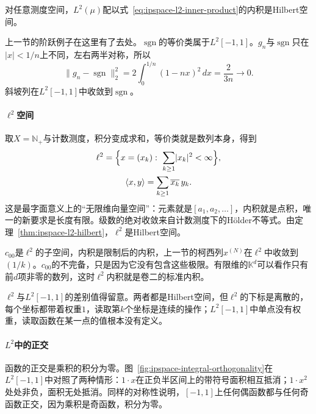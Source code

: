 \begin{theorem}[$L^2$是Hilbert空间]
\label{thm:ipspace-l2-hilbert}
对任意测度空间，$L^2(\mu)$配以式~\eqref{eq:ipspace-l2-inner-product}的内积是Hilbert空间。
\end{theorem}

上一节的阶跃例子在这里有了去处。$\operatorname{sgn}$的等价类属于$L^2[-1,1]$。$g_n$与$\operatorname{sgn}$只在$\lvert x\rvert<1/n$上不同，左右两半对称，所以
\[
 \lVert g_n-\operatorname{sgn}\rVert_2^2=2\int_0^{1/n}(1-nx)^2\,dx=\frac{2}{3n}\to0 .
\]
斜坡列在$L^2[-1,1]$中收敛到$\operatorname{sgn}$。

\paragraph{\texorpdfstring{$\ell^2$}{l2}空间}
取$X=\mathbb N_+$与计数测度，积分变成求和，等价类就是数列本身，得到
\begin{equation}
 \begin{gathered}
 \ell^2=\Bigl\{x=(x_k):\ \sum_{k\geq1}\lvert x_k\rvert^2<\infty\Bigr\},\\
 \langle x,y\rangle=\sum_{k\geq1}\overline{x_k}\,y_k .
 \end{gathered}
 \label{eq:ipspace-ell2}
\end{equation}
这是最字面意义上的“无限维向量空间”：元素就是$[a_1,a_2,\ldots]$，内积就是点积，唯一的新要求是长度有限。级数的绝对收敛来自计数测度下的Hölder不等式。由定理~\ref{thm:ipspace-l2-hilbert}，$\ell^2$是Hilbert空间。

$c_{00}$是$\ell^2$的子空间，内积是限制后的内积，上一节的柯西列$x^{(N)}$在$\ell^2$中收敛到$(1/k)$。$c_{00}$的不完备，只是因为它没有包含这些极限。有限维的$\mathbb K^d$可以看作只有前$d$项非零的数列，这时$\ell^2$内积就是卷二的标准内积。

$\ell^2$与$L^2[-1,1]$的差别值得留意。两者都是Hilbert空间，但$\ell^2$的下标是离散的，每个坐标都带着权重$1$，读取第$k$个坐标是连续的操作；$L^2[-1,1]$中单点没有权重，读取函数在某一点的值根本没有定义。

\paragraph{\texorpdfstring{$L^2$}{L2}中的正交}
函数的正交是乘积的积分为零。图~\ref{fig:ipspace-integral-orthogonality}在$L^2[-1,1]$中对照了两种情形：$1\cdot x$在正负半区间上的带符号面积相互抵消；$1\cdot x^2$处处非负，面积无处抵消。同样的对称性说明，$[-1,1]$上任何偶函数都与任何奇函数正交，因为乘积是奇函数，积分为零。

